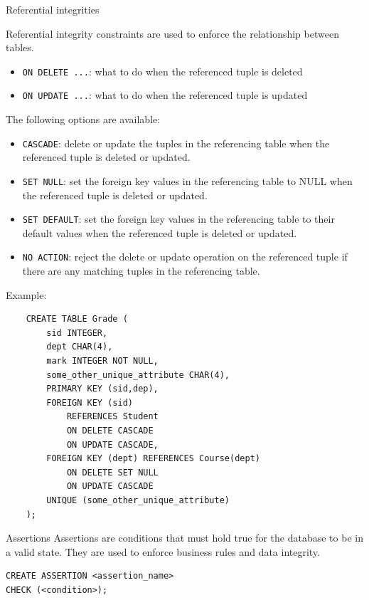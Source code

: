 \begin{definition}
    {Referential integrities}

    Referential integrity constraints are used to enforce the relationship between tables.

    \begin{itemize}
        \item \texttt{ON DELETE ...}: what to do when the referenced tuple is deleted
        \item \texttt{ON UPDATE ...}: what to do when the referenced tuple is updated
    \end{itemize}

    The following options are available:

    \begin{itemize}
        \item \texttt{CASCADE}: delete or update the tuples in the referencing table when the referenced tuple is deleted or updated.
        \item \texttt{SET NULL}: set the foreign key values in the referencing table to NULL when the referenced tuple is deleted or updated.
        \item \texttt{SET DEFAULT}: set the foreign key values in the referencing table to their default values when the referenced tuple is deleted or updated.
        \item \texttt{NO ACTION}: reject the delete or update operation on the referenced tuple if there are any matching tuples in the referencing table.
    \end{itemize}
\end{definition}

Example:

\begin{verbatim}
    CREATE TABLE Grade (
        sid INTEGER,
        dept CHAR(4), 
        mark INTEGER NOT NULL,
        some_other_unique_attribute CHAR(4),   
        PRIMARY KEY (sid,dep),
        FOREIGN KEY (sid) 
            REFERENCES Student
            ON DELETE CASCADE
            ON UPDATE CASCADE,
        FOREIGN KEY (dept) REFERENCES Course(dept)
            ON DELETE SET NULL
            ON UPDATE CASCADE
        UNIQUE (some_other_unique_attribute)
    );
\end{verbatim}

\begin{definition}
    {Assertions}
    Assertions are conditions that must hold true for the database to be in a valid state. They are used to enforce business rules and data integrity.

    \begin{verbatim}
CREATE ASSERTION <assertion_name>
CHECK (<condition>);
    \end{verbatim}
\end{definition}

